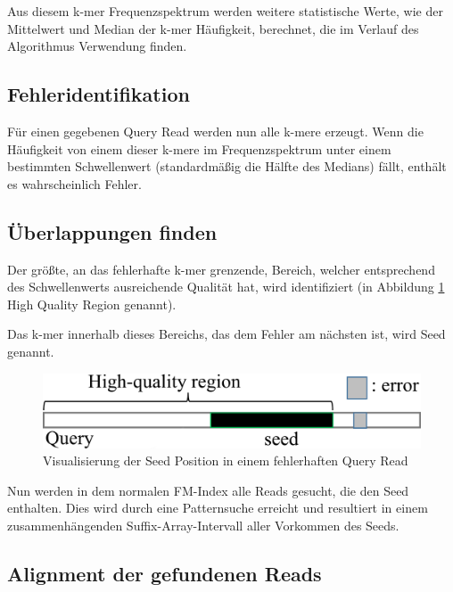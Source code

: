 Aus diesem k-mer Frequenzspektrum werden weitere statistische Werte, wie der Mittelwert und Median der k-mer Häufigkeit, berechnet, die im Verlauf des Algorithmus Verwendung finden.


\subsection{Fehleridentifikation}
\label{subsec:fehleridentifikation}

Für einen gegebenen Query Read werden nun alle k-mere erzeugt.
Wenn die Häufigkeit von einem dieser k-mere im Frequenzspektrum unter einem bestimmten Schwellenwert (standardmäßig die Hälfte des Medians) fällt, enthält es wahrscheinlich Fehler.


\subsection{Überlappungen finden}
\label{subsec:ueberlappungen-finden}

Der größte, an das fehlerhafte k-mer grenzende, Bereich, welcher entsprechend des Schwellenwerts ausreichende Qualität hat, wird identifiziert (in Abbildung \ref{fig:seed} High Quality Region genannt). 

Das k-mer innerhalb dieses Bereichs, das dem Fehler am nächsten ist, wird Seed genannt.

\begin{figure}[h]
	\begin{center}
		\includegraphics[]{./img/seed.png}
	\end{center}
	\caption{Visualisierung der Seed Position in einem fehlerhaften Query Read}
	\label{fig:seed}
\end{figure}

Nun werden in dem normalen FM-Index alle Reads gesucht, die den Seed enthalten. Dies wird durch eine Patternsuche erreicht und resultiert in einem zusammenhängenden Suffix-Array-Intervall aller Vorkommen des Seeds.


\subsection{Alignment der gefundenen Reads}
\label{subsec:alignment}


